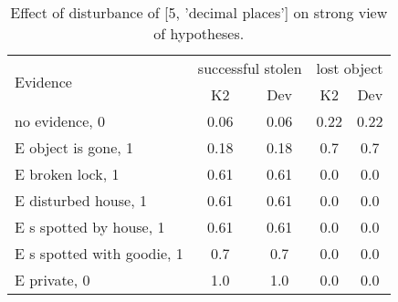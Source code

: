 \begin{table}\begin{tabular}{l|cc|cc}\toprule\multirow{2}{*}{Evidence} & \multicolumn{2}{c}{successful stolen}& \multicolumn{2}{c}{lost object}\\& {K2} & {Dev}& {K2} & {Dev}\\\midrule
no evidence, 0 & 0.06&0.06&0.22&0.22\\E object is gone, 1 & 0.18&0.18&0.7&0.7\\E broken lock, 1 & 0.61&0.61&0.0&0.0\\E disturbed house, 1 & 0.61&0.61&0.0&0.0\\E s spotted by house, 1 & 0.61&0.61&0.0&0.0\\E s spotted with goodie, 1 & 0.7&0.7&0.0&0.0\\E private, 0 & 1.0&1.0&0.0&0.0\\\bottomrule\end{tabular}\caption{Effect of disturbance of [5, 'decimal places'] on strong view of hypotheses.}\end{table}